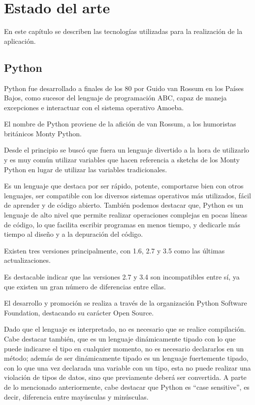 \cleardoublepage
\chapter{Estado del arte}


En este capítulo se describen las tecnologías utilizadas para la realización de la aplicación.

\section{Python} 
\label{sec:python}


Python fue desarrollado a finales de los 80 por Guido van Rossum en los Países Bajos, como sucesor del lenguaje de programación ABC, capaz de maneja excepciones  e interactuar con el sistema operativo Amoeba.


El nombre de Python proviene de la afición de van Rossum, a los humoristas británicos Monty Python.


Desde el principio se buscó que fuera un lenguaje divertido a la hora de utilizarlo y es muy común utilizar variables que hacen referencia a sketchs de los Monty Python en lugar de utilizar las variables tradicionales.


Es un lenguaje que destaca por ser rápido, potente, comportarse bien con otros lenguajes, ser compatible con los diversos sistemas operativos más utilizados, fácil de aprender y de código abierto. También podemos destacar que, Python es un lenguaje de alto nivel que permite realizar operaciones complejas en pocas líneas de código, lo que facilita escribir programas en menos tiempo, y dedicarle más tiempo al diseño y a la depuración del código.


Existen tres versiones principalmente, con 1.6, 2.7 y 3.5 como las últimas actualizaciones. 


Es destacable indicar que las versiones 2.7 y 3.4 son incompatibles entre sí, ya que existen un gran número de diferencias entre ellas.


El desarrollo y promoción se realiza a través de la organización Python Software Foundation, destacando su carácter Open Source.


Dado que el lenguaje es interpretado, no es necesario que se realice compilación. Cabe destacar también, que es un lenguaje dinámicamente tipado con lo que puede indicarse el tipo en cualquier momento, no es necesario declararlos en un método; además de ser dinámicamente tipado es un lenguaje fuertemente tipado, con lo que una vez declarada una variable con un tipo, esta no puede realizar una violación de tipos de datos, sino que previamente deberá ser convertida. A parte de lo mencionado anteriormente, cabe destacar que Python es “case sensitive”, es decir, diferencia entre mayúsculas y minúsculas. 


